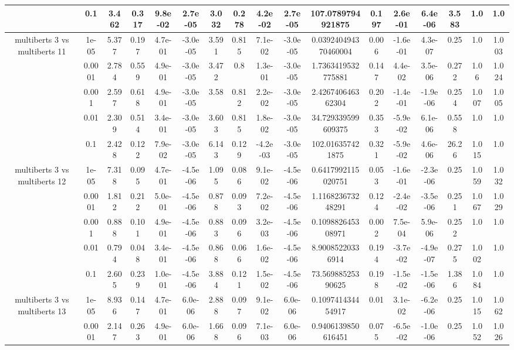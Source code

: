 \begin{tabular}{|c|c|c|c|c|c|c|c|c|c|c|c|c|c|c|c|c|}
 & 0.1 & 3.462 & 0.317 & 9.8e-02 & 2.7e-05 & 3.032 & 0.278 & 4.2e-02 & 2.7e-05 & 107.0789794921875 & 0.197 & 2.6e-01 & 6.4e-06 & 3.583 & 1.0 & 1.0 \\
\hline
\multirow{5}{*}{multiberts 3 vs multiberts 11} & 1e-05 & 5.377 & 0.197 & 4.7e-01 & -3.0e-05 & 3.591 & 0.815 & 7.1e-02 & -3.0e-05 & 0.039240494370460004 & 0.006 & -1.6e-01 & 4.3e-07 & 0.25 & 1.0 & 1.003 \\
 & 0.0001 & 2.784 & 0.559 & 4.9e-01 & -3.0e-05 & 3.472 & 0.8 & 1.3e-01 & -3.0e-05 & 1.7363419532775881 & 0.147 & 4.4e-02 & 3.5e-06 & 0.272 & 1.06 & 1.024 \\
 & 0.001 & 2.597 & 0.618 & 4.9e-01 & -3.0e-05 & 3.58 & 0.812 & 2.2e-02 & -3.0e-05 & 2.426740646362304 & 0.202 & -1.4e-01 & -1.9e-06 & 0.254 & 1.007 & 1.005 \\
 & 0.01 & 2.309 & 0.514 & 3.4e-01 & -3.0e-05 & 3.603 & 0.815 & 1.8e-02 & -3.0e-05 & 34.729339599609375 & 0.353 & -5.9e-02 & 6.1e-06 & 0.558 & 1.0 & 1.0 \\
 & 0.1 & 2.428 & 0.122 & 7.9e-02 & -3.0e-05 & 6.143 & 0.129 & -4.2e-03 & -3.0e-05 & 102.016357421875 & 0.321 & -5.9e-02 & 4.6e-06 & 26.26 & 1.015 & 1.0 \\
\hline
\multirow{5}{*}{multiberts 3 vs multiberts 12} & 1e-05 & 7.318 & 0.095 & 4.7e-01 & -4.5e-06 & 1.095 & 0.086 & 9.1e-02 & -4.5e-06 & 0.6417992115020751 & 0.053 & -1.6e-01 & -2.3e-06 & 0.25 & 1.059 & 1.032 \\
 & 0.0001 & 1.812 & 0.212 & 5.0e-01 & -4.5e-06 & 0.878 & 0.093 & 7.2e-02 & -4.5e-06 & 1.116823673248291 & 0.124 & -2.4e-02 & -3.5e-06 & 0.251 & 1.067 & 1.029 \\
 & 0.001 & 0.888 & 0.101 & 4.9e-01 & -4.5e-06 & 0.883 & 0.096 & 3.2e-03 & -4.5e-06 & 0.109882645308971 & 0.002 & 7.5e-04 & 5.9e-06 & 0.252 & 1.0 & 1.0 \\
 & 0.01 & 0.794 & 0.048 & 3.4e-01 & -4.5e-06 & 0.868 & 0.066 & 1.6e-02 & -4.5e-06 & 8.90085220336914 & 0.194 & -3.7e-02 & -4.9e-07 & 0.275 & 1.002 & 1.0 \\
 & 0.1 & 2.605 & 0.239 & 1.0e-01 & -4.5e-06 & 3.884 & 0.121 & 1.5e-02 & -4.5e-06 & 73.56988525390625 & 0.198 & -1.5e-02 & -1.5e-06 & 1.386 & 1.084 & 1.0 \\
\hline
\multirow{5}{*}{multiberts 3 vs multiberts 13} & 1e-05 & 8.936 & 0.147 & 4.7e-01 & 6.0e-06 & 2.888 & 0.097 & 9.1e-02 & 6.0e-06 & 0.109741434454917 & 0.01 & 3.1e-02 & -6.2e-06 & 0.25 & 1.015 & 1.062 \\
 & 0.0001 & 2.147 & 0.263 & 4.9e-01 & 6.0e-06 & 1.668 & 0.096 & 7.1e-03 & 6.0e-06 & 0.9406139850616451 & 0.075 & -6.5e-02 & -1.0e-06 & 0.25 & 1.052 & 1.026 \\

\end{tabular}
